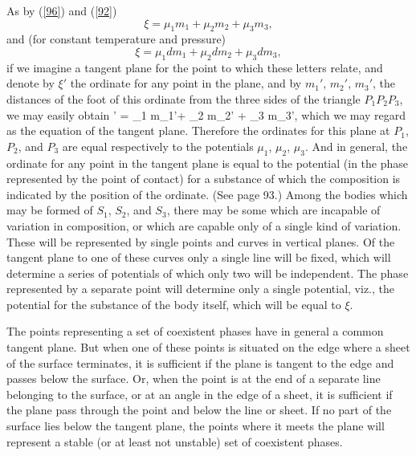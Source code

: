 \documentclass[12pt]{article}
\begin{document}
As by (\ref{96}) and (\ref{92})
$$\xi= \mu_1 m_1+ \mu_2 m_2 +  \mu_3 m_3,$$
and (for constant temperature and pressure)
$$\xi= \mu_1 d m_1+ \mu_2 d m_2 +  \mu_3 d m_3,$$
if we imagine a tangent plane for the point to which these letters relate, and denote by $\xi'$ the ordinate for any point in the plane, and by $m_1'$, $m_2'$, $m_3'$, the distances of the foot of this ordinate from the three sides of the triangle $P_1 P_2 P_3$, we may easily obtain
\eqs  
\xi' = \mu_1 m_1'+ \mu_2 m_2' +  \mu_3 m_3', 
\label{199}\eqe
which we may regard as the equation of the tangent plane. Therefore the ordinates for this plane at $P_1$, $P_2$, and $P_3$ are equal respectively to the potentials $\mu_1$, $\mu_2$, $\mu_3$. And in general, the ordinate for any point in the tangent plane is equal to the potential (in the phase represented by the point of contact) for a substance of which the composition is indicated by the position of the ordinate. (See page 93.) Among the bodies which may be formed of $S_1$, $S_2$, and $S_3$, there may be some which are incapable of variation in composition, or which are capable only of a single kind of variation. These will be represented by single points and curves in vertical planes. Of the tangent plane to one of these curves only a single line will be fixed, which will determine a series of potentials of which only two will be independent. The phase represented by a separate point will determine only a single potential, viz., the potential for the substance of the body itself, which will be equal to $\xi$.


The points representing a set of coexistent phases have in general a common tangent plane. But when one of these points is situated on the edge where a sheet of the surface terminates, it is sufficient if the plane is tangent to the edge and passes below the surface. Or, when the point is at the end of a separate line belonging to the surface, or at an angle in the edge of a sheet, it is sufficient if the plane pass through the point and below the line or sheet. If no part of the surface lies below the tangent plane, the points where it meets the plane will represent a stable (or at least not unstable) set of coexistent phases.
\end{document}
